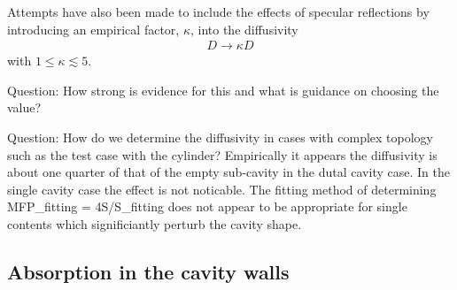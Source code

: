 \documentclass[a4paper]{article}
\numberwithin{equation}{section}
\begin{document}
Attempts have also been made to include the effects of specular reflections by
introducing an empirical factor, ${\kappa}$, into the diffusivity 
\begin{align}
D \rightarrow \kappa D
\end{align}
with $1\leq\kappa\lesssim 5$. 

{\color{red} Question: How strong is evidence for this and what is guidance on choosing the
value?}

{\color{red} Question: How do we determine the diffusivity in cases with complex topology such as
the test case with the cylinder? Empirically it appears the diffusivity is about one quarter of that
of the empty sub-cavity in the dutal cavity case. In the single cavity case the effect is not
noticable. The fitting method of determining MFP_fitting = 4S/S_fitting does not appear to be
appropriate for single contents which significiantly perturb the cavity shape.}

\subsection[Absorption in the cavity walls]{Absorption in the cavity walls}
\label{sc:sum:abs}
\end{document}
